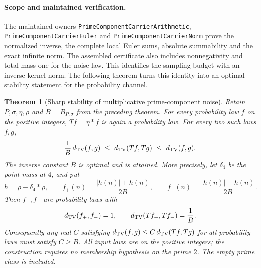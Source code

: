 \documentclass[11pt]{article}
\newtheorem{theorem}{Theorem}[section]
\theoremstyle{definition}
\begin{document}
\paragraph{Scope and maintained verification.}
The maintained owners \texttt{PrimeComponentCarrierArithmetic},
\texttt{PrimeComponentCarrierEuler} and
\texttt{PrimeComponentCarrierNorm} prove the normalized inverse,
the complete local Euler sums, absolute summability and the exact
infinite norm. The assembled certificate also includes
nonnegativity and total mass one for the noise law.
This identifies the sampling budget with an inverse-kernel norm.
The following theorem turns this identity into an optimal
stability statement for the probability channel.

\begin{theorem}[Sharp stability of multiplicative prime-component noise]
\label{thm:component-carrier-sharp-probability-stability}
Retain \(P,\sigma,\eta,\rho\) and \(B=B_{P,\sigma}\) from the
preceding theorem. For every probability law \(f\) on the positive
integers, \(T f=\eta*f\) is again a probability law. For every two
such laws \(f,g\),
\[
 \frac1B\,d_{\rm TV}(f,g)
 \ \le\ d_{\rm TV}(Tf,Tg)
 \ \le\ d_{\rm TV}(f,g).
\]
The inverse constant \(B\) is optimal and is attained.
More precisely, let \(\delta_4\) be the point mass at \(4\), and put
\[
 h=\rho-\delta_4*\rho,\qquad
 f_+(n)=\frac{|h(n)|+h(n)}{2B},\qquad
 f_-(n)=\frac{|h(n)|-h(n)}{2B}.
\]
Then \(f_+,f_-\) are probability laws with
\[
 d_{\rm TV}(f_+,f_-)=1,\qquad
 d_{\rm TV}(Tf_+,Tf_-)=\frac1B.
\]
Consequently any real \(C\) satisfying
\(d_{\rm TV}(f,g)\le C\,d_{\rm TV}(Tf,Tg)\) for all probability
laws must satisfy \(C\ge B\).
All input laws are on the positive integers; the construction
requires no membership hypothesis on the prime \(2\).
The empty prime class is included.
\end{theorem}
\end{document}
